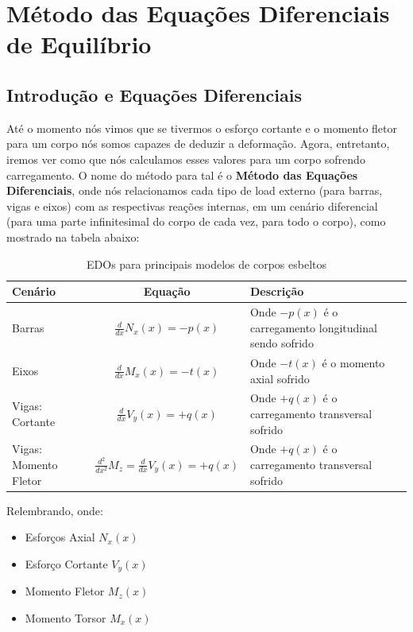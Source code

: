 \documentclass{article}
\begin{document}
\newpage

\section{Método das Equações Diferenciais de Equilíbrio}
\subsection{Introdução e Equações Diferenciais}
Até o momento nós vimos que se tivermos o esforço cortante e o momento fletor para um corpo nós somos capazes de deduzir a deformação. Agora, entretanto, iremos ver como que nós calculamos
esses valores para um corpo sofrendo carregamento. O nome do método para tal é o \textbf{Método das Equações Diferenciais}, onde nós relacionamos cada tipo de load externo (para barras,
vigas e eixos) com as respectivas reações internas, em um cenário diferencial (para uma parte infinitesimal do corpo de cada vez, para todo o corpo), como mostrado na tabela abaixo:

\begin{table}[h]
    \centering
    \begin{tabular}{|l|c|l|}\hline
        \textbf{Cenário}                      & \textbf{Equação}                                   & \textbf{Descrição}                                       \\ \hline
        \rule{0pt}{4ex} Barras                & $\frac{d}{dx}N_x(x) = -p(x)$                       & Onde $-p(x)$ é o carregamento longitudinal sendo sofrido \\[2ex]  \hline
        \rule{0pt}{4ex} Eixos                 & $\frac{d}{dx}M_x(x) = -t(x)$                       & Onde $-t(x)$ é o momento axial sofrido                   \\[2ex]\hline
        \rule{0pt}{4ex} Vigas: Cortante       & $\frac{d}{dx}V_y(x) = +q(x)$                       & Onde $+q(x)$ é o carregamento transversal sofrido        \\[2ex] \hline
        \rule{0pt}{4ex} Vigas: Momento Fletor & $\frac{d^2}{dx^2}M_z = \frac{d}{dx}V_y(x) = +q(x)$ & Onde $+q(x)$ é o carregamento transversal sofrido        \\[2ex] \hline
    \end{tabular}
    \caption{EDOs para principais modelos de corpos esbeltos}
    \label{tb:edo_esf_internos}
\end{table}

Relembrando, onde:
\begin{itemize}
    \item Esforços Axial $N_x(x)$
    \item Esforço Cortante $V_y(x)$
    \item Momento Fletor $M_z(x)$
    \item Momento Torsor $M_x(x)$
\end{itemize}
\end{document}

